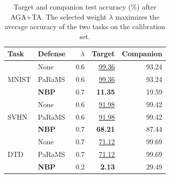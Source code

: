 \begin{table}[!htbp]
\centering
\small
\setlength{\tabcolsep}{4pt}
\caption{Target and companion test accuracy (\%) after AGA+TA. The selected weight $\lambda$ maximizes the average accuracy of the two tasks on the calibration set.}
\label{tab:coefficient-selection}
\begin{tabular}{llrrr}
\toprule
Task & Defense & $\lambda$ & Target & Companion \\
\midrule
\multirow{3}{*}{MNIST} & None & 0.6 & \underline{99.36} & 93.24 \\
 & PaRaMS~\cite{wei2025params} & 0.6 & \underline{99.36} & 93.24 \\
 & \textbf{NBP} & 0.7 & \textbf{11.35} & 19.59 \\
\midrule
\multirow{3}{*}{SVHN} & None & 0.6 & \underline{91.98} & 99.42 \\
 & PaRaMS~\cite{wei2025params} & 0.6 & \underline{91.98} & 99.42 \\
 & \textbf{NBP} & 0.7 & \textbf{68.21} & 87.44 \\
\midrule
\multirow{3}{*}{DTD} & None & 0.7 & \underline{71.12} & 99.69 \\
 & PaRaMS~\cite{wei2025params} & 0.7 & \underline{71.12} & 99.69 \\
 & \textbf{NBP} & 0.2 & \textbf{2.13} & 29.49 \\
\bottomrule
\end{tabular}
\end{table}
